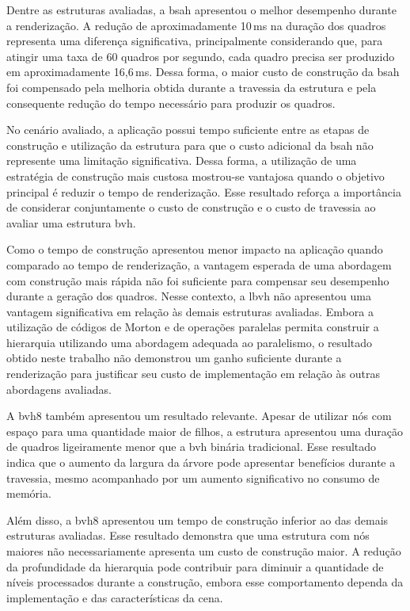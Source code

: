 Dentre as estruturas avaliadas, a \gls{bsah} apresentou o melhor desempenho durante a renderização. A redução de aproximadamente 10\,ms na duração dos quadros representa uma diferença significativa, principalmente considerando que, para atingir uma taxa de 60 quadros por segundo, cada quadro precisa ser produzido em aproximadamente 16,6\,ms. Dessa forma, o maior custo de construção da \gls{bsah} foi compensado pela melhoria obtida durante a travessia da estrutura e pela consequente redução do tempo necessário para produzir os quadros.

No cenário avaliado, a aplicação possui tempo suficiente entre as etapas de construção e utilização da estrutura para que o custo adicional da \gls{bsah} não represente uma limitação significativa. Dessa forma, a utilização de uma estratégia de construção mais custosa mostrou-se vantajosa quando o objetivo principal é reduzir o tempo de renderização. Esse resultado reforça a importância de considerar conjuntamente o custo de construção e o custo de travessia ao avaliar uma estrutura \gls{bvh}.

Como o tempo de construção apresentou menor impacto na aplicação quando comparado ao tempo de renderização, a vantagem esperada de uma abordagem com construção mais rápida não foi suficiente para compensar seu desempenho durante a geração dos quadros. Nesse contexto, a \gls{lbvh} não apresentou uma vantagem significativa em relação às demais estruturas avaliadas. Embora a utilização de códigos de Morton e de operações paralelas permita construir a hierarquia utilizando uma abordagem adequada ao paralelismo, o resultado obtido neste trabalho não demonstrou um ganho suficiente durante a renderização para justificar seu custo de implementação em relação às outras abordagens avaliadas.

A \gls{bvh8} também apresentou um resultado relevante. Apesar de utilizar nós com espaço para uma quantidade maior de filhos, a estrutura apresentou uma duração de quadros ligeiramente menor que a \gls{bvh} binária tradicional. Esse resultado indica que o aumento da largura da árvore pode apresentar benefícios durante a travessia, mesmo acompanhado por um aumento significativo no consumo de memória.

Além disso, a \gls{bvh8} apresentou um tempo de construção inferior ao das demais estruturas avaliadas. Esse resultado demonstra que uma estrutura com nós maiores não necessariamente apresenta um custo de construção maior. A redução da profundidade da hierarquia pode contribuir para diminuir a quantidade de níveis processados durante a construção, embora esse comportamento dependa da implementação e das características da cena.


